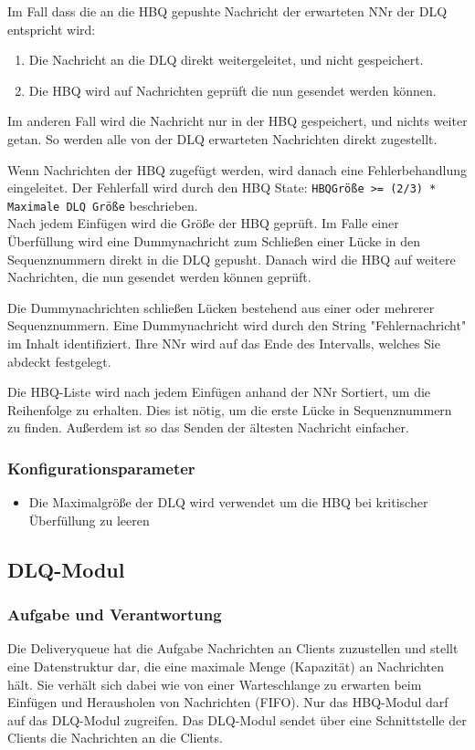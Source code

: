 \documentclass{article}
\begin{document}
Im Fall dass die an die HBQ gepushte Nachricht der erwarteten NNr der DLQ entspricht wird:
	\begin{enumerate}
		\item{Die Nachricht an die DLQ direkt weitergeleitet, und nicht gespeichert.}
		\item{Die HBQ wird auf Nachrichten geprüft die nun gesendet werden können.}
	\end{enumerate}

Im anderen Fall wird die Nachricht nur in der HBQ gespeichert, und nichts weiter getan.
So werden alle von der DLQ erwarteten Nachrichten direkt zugestellt. 

Wenn Nachrichten der HBQ zugefügt werden, wird danach eine Fehlerbehandlung eingeleitet. Der Fehlerfall wird durch den
HBQ State: \texttt{HBQGröße >= (2/3) * Maximale DLQ Größe} beschrieben.\\

Nach jedem Einfügen wird die Größe der HBQ geprüft. Im Falle einer Überfüllung
wird eine Dummynachricht zum Schließen einer Lücke in den Sequenznummern direkt in 
die DLQ gepusht. Danach wird die HBQ auf weitere Nachrichten, die nun gesendet werden können geprüft.

Die Dummynachrichten schließen Lücken bestehend aus einer oder mehrerer Sequenznummern. Eine Dummynachricht wird durch
den String "Fehlernachricht" im Inhalt identifiziert. Ihre NNr wird auf das Ende des Intervalls, welches Sie abdeckt
festgelegt.

Die HBQ-Liste wird nach jedem Einfügen anhand der NNr Sortiert, um die Reihenfolge zu erhalten.
Dies ist nötig, um die erste Lücke in Sequenznummern zu finden. Außerdem ist so das Senden der
ältesten Nachricht einfacher.

\subsubsection{Konfigurationsparameter}
\begin{itemize}
	\item Die Maximalgröße der DLQ wird verwendet um die HBQ bei kritischer Überfüllung zu leeren
\end{itemize}
\newpage

\subsection{DLQ-Modul}
\subsubsection{Aufgabe und Verantwortung}
Die Deliveryqueue hat die Aufgabe Nachrichten an Clients zuzustellen und stellt eine Datenstruktur dar, die eine
maximale Menge (Kapazität) an Nachrichten hält. Sie verhält sich dabei wie von einer Warteschlange zu erwarten beim
Einfügen und Herausholen von Nachrichten (FIFO). Nur das HBQ-Modul darf auf das DLQ-Modul zugreifen. Das DLQ-Modul
sendet über eine Schnittstelle der Clients die Nachrichten an die Clients.
\end{document}
